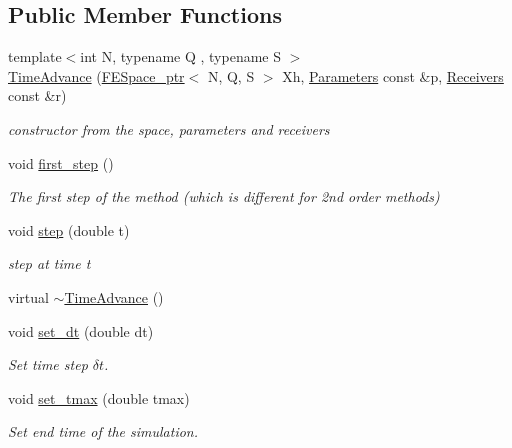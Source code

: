\subsection*{Public Member Functions}
\begin{DoxyCompactItemize}
\item 
{\footnotesize template$<$int N, typename Q , typename S $>$ }\\\hyperlink{classTspeed_1_1TimeAdvance_ab7fb5289ea62abe7da6c4423bf19f667}{Time\-Advance} (\hyperlink{namespaceTspeed_a05fcb57094666c8f5ab1e90d1a6fecf8}{F\-E\-Space\-\_\-ptr}$<$ N, Q, S $>$ Xh, \hyperlink{classTspeed_1_1Parameters}{Parameters} const \&p, \hyperlink{classTspeed_1_1Receivers}{Receivers} const \&r)
\begin{DoxyCompactList}\small\item\em constructor from the space, parameters and receivers \end{DoxyCompactList}\item 
void \hyperlink{classTspeed_1_1TimeAdvance_ae9d353495c283af5a29740a70424f11d}{first\-\_\-step} ()
\begin{DoxyCompactList}\small\item\em The first step of the method (which is different for 2nd order methods) \end{DoxyCompactList}\item 
void \hyperlink{classTspeed_1_1TimeAdvance_a3328d4d45d9261de6bfdd8e447f88d63}{step} (double t)
\begin{DoxyCompactList}\small\item\em step at time t \end{DoxyCompactList}\item 
virtual \hyperlink{classTspeed_1_1TimeAdvance_a73dfdea3bdb8e9f33e7223399ac9f14c}{$\sim$\-Time\-Advance} ()
\item 
void \hyperlink{classTspeed_1_1TimeAdvance_a2538fb7b6ee62103de78f42158bf38e6}{set\-\_\-dt} (double dt)
\begin{DoxyCompactList}\small\item\em Set time step $\delta t $. \end{DoxyCompactList}\item 
void \hyperlink{classTspeed_1_1TimeAdvance_ac0d8cd9b2b704e7cd4a2dd0793ce085d}{set\-\_\-tmax} (double tmax)
\begin{DoxyCompactList}\small\item\em Set end time of the simulation. \end{DoxyCompactList}\item 

\end{DoxyCompactItemize}
